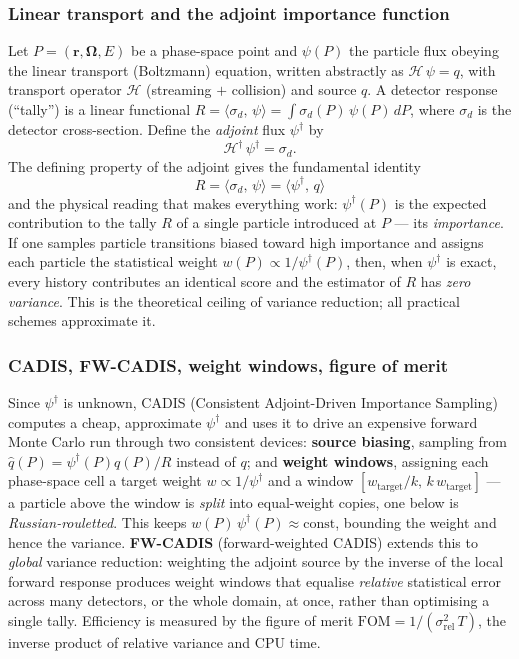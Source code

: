 \documentclass[a4paper,fleqn]{cas-sc}
\newcommand{\dg}{^{\dagger}}
\newcommand{\ip}[2]{\langle #1,\,#2\rangle}
\begin{document}
	\subsubsection{Linear transport and the adjoint importance function}
	Let $P=(\mathbf r,\mathbf\Omega,E)$ be a phase-space point and $\psi(P)$ the particle flux
	obeying the linear transport (Boltzmann) equation, written abstractly as $\mathcal H\,\psi
	= q$, with transport operator $\mathcal H$ (streaming $+$ collision) and source $q$. A
	detector response (``tally'') is a linear functional $R=\ip{\sigma_d}{\psi}=\int
	\sigma_d(P)\,\psi(P)\,dP$, where $\sigma_d$ is the detector cross-section. Define the
	\emph{adjoint} flux $\psi\dg$ by
	\begin{equation}
		\mathcal H\dg\,\psi\dg=\sigma_d .
		\label{eq:adjoint}
	\end{equation}
	The defining property of the adjoint gives the fundamental identity
	\begin{equation}
		\boxed{\;R=\ip{\sigma_d}{\psi}=\ip{\psi\dg}{q}\;}
		\label{eq:fund}
	\end{equation}
	and the physical reading that makes everything work: $\psi\dg(P)$ is the expected
	contribution to the tally $R$ of a single particle introduced at $P$ --- its
	\emph{importance}. If one samples particle transitions biased toward high importance and
	assigns each particle the statistical weight $w(P)\propto 1/\psi\dg(P)$, then, when
	$\psi\dg$ is exact, every history contributes an identical score and the estimator of $R$
	has \emph{zero variance}. This is the theoretical ceiling of variance reduction; all
	practical schemes approximate it.
	
	\subsubsection{CADIS, FW-CADIS, weight windows, figure of merit}
	Since $\psi\dg$ is unknown, CADIS (Consistent Adjoint-Driven Importance Sampling) computes
	a cheap, approximate $\psi\dg$ and uses it to drive an expensive forward Monte Carlo run
	through two consistent devices: \textbf{source biasing}, sampling from
	$\hat q(P)=\psi\dg(P)q(P)/R$ instead of $q$; and \textbf{weight windows}, assigning each
	phase-space cell a target weight $w\propto 1/\psi\dg$ and a window
	$[w_{\text{target}}/k,\,k\,w_{\text{target}}]$ --- a particle above the window is
	\emph{split} into equal-weight copies, one below is \emph{Russian-rouletted}. This keeps
	$w(P)\,\psi\dg(P)\approx\text{const}$, bounding the weight and hence the variance.
	\textbf{FW-CADIS} (forward-weighted CADIS) extends this to \emph{global} variance
	reduction: weighting the adjoint source by the inverse of the local forward response
	produces weight windows that equalise \emph{relative} statistical error across many
	detectors, or the whole domain, at once, rather than optimising a single tally. Efficiency
	is measured by the figure of merit $\mathrm{FOM}=1/(\sigma_{\mathrm{rel}}^2\,T)$, the
	inverse product of relative variance and CPU time.
	
\end{document}
